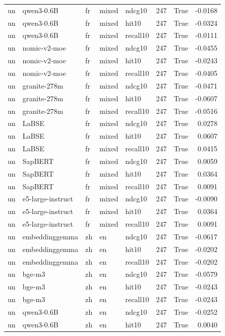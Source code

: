 \begin{tabular}{lllllrrr}
un & qwen3-0.6B & fr & mixed & ndcg10 & 247 & True & -0.0168 \\
un & qwen3-0.6B & fr & mixed & hit10 & 247 & True & -0.0324 \\
un & qwen3-0.6B & fr & mixed & recall10 & 247 & True & -0.0111 \\
un & nomic-v2-moe & fr & mixed & ndcg10 & 247 & True & -0.0455 \\
un & nomic-v2-moe & fr & mixed & hit10 & 247 & True & -0.0243 \\
un & nomic-v2-moe & fr & mixed & recall10 & 247 & True & -0.0405 \\
un & granite-278m & fr & mixed & ndcg10 & 247 & True & -0.0471 \\
un & granite-278m & fr & mixed & hit10 & 247 & True & -0.0607 \\
un & granite-278m & fr & mixed & recall10 & 247 & True & -0.0516 \\
un & LaBSE & fr & mixed & ndcg10 & 247 & True & 0.0278 \\
un & LaBSE & fr & mixed & hit10 & 247 & True & 0.0607 \\
un & LaBSE & fr & mixed & recall10 & 247 & True & 0.0415 \\
un & SapBERT & fr & mixed & ndcg10 & 247 & True & 0.0059 \\
un & SapBERT & fr & mixed & hit10 & 247 & True & 0.0364 \\
un & SapBERT & fr & mixed & recall10 & 247 & True & 0.0091 \\
un & e5-large-instruct & fr & mixed & ndcg10 & 247 & True & -0.0090 \\
un & e5-large-instruct & fr & mixed & hit10 & 247 & True & 0.0364 \\
un & e5-large-instruct & fr & mixed & recall10 & 247 & True & 0.0091 \\
un & embeddinggemma & zh & en & ndcg10 & 247 & True & -0.0617 \\
un & embeddinggemma & zh & en & hit10 & 247 & True & -0.0202 \\
un & embeddinggemma & zh & en & recall10 & 247 & True & -0.0202 \\
un & bge-m3 & zh & en & ndcg10 & 247 & True & -0.0579 \\
un & bge-m3 & zh & en & hit10 & 247 & True & -0.0243 \\
un & bge-m3 & zh & en & recall10 & 247 & True & -0.0243 \\
un & qwen3-0.6B & zh & en & ndcg10 & 247 & True & -0.0252 \\
un & qwen3-0.6B & zh & en & hit10 & 247 & True & 0.0040 \\

\end{tabular}
